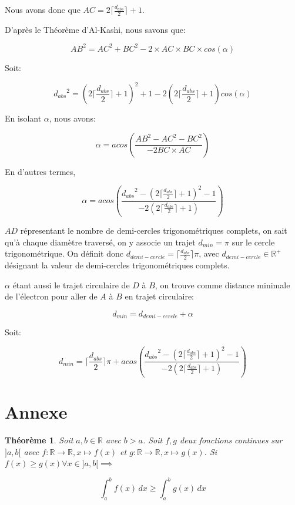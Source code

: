 \documentclass{amsart}
\newtheorem{theorem}{Théorème}[section]
\theoremstyle{definition}
\theoremstyle{remark}
\numberwithin{equation}{section}
\begin{document}
Nous avons donc que $AC=2\lceil\frac{d_{abs}}{2}\rceil+1$.

D'après le Théorème d'Al-Kashi, nous savons que:

\[AB^2=AC^2+BC^2-2\times AC \times BC \times cos(\alpha)\]

Soit: 

\[{d_{abs}}^2=(2\lceil\frac{d_{abs}}{2}\rceil+1)^2 +1 -2(2\lceil\frac{d_{abs}}{2}\rceil+1) cos(\alpha)\]

En isolant $\alpha$, nous avons:

\[\alpha=acos(\frac{AB^2-AC^2-BC^2}{-2BC\times AC})\]

En d'autres termes,

\[\alpha=acos(\frac{{d_{abs}}^2 -(2\lceil\frac{d_{abs}}{2}\rceil+1)^2-1}{-2(2\lceil\frac{d_{abs}}{2}\rceil+1)})\]

$AD$ répresentant le nombre de demi-cercles trigonométriques complets, on sait qu'à chaque diamètre traversé, on y associe un trajet $d_{min}=\pi$ sur le cercle trigonométrique. On définit donc $d_{demi-cercle}=\lceil \frac{d_{abs}}{2} \rceil\pi$, avec $d_{demi-cercle}\in\mathbb{R^+}$ désignant la valeur de demi-cercles trigonométriques complets.

$\alpha$ étant aussi le trajet circulaire de $D$ à $B$, on trouve comme distance minimale de l'électron pour aller de $A$ à $B$ en trajet circulaire:

\[d_{min}=d_{demi-cercle}+ \alpha\]

Soit:

\[d_{min}= \lceil\frac{d_{abs}}{2}\rceil\pi + acos(\frac{{d_{abs}}^2-(2\lceil\frac{d_{abs}}{2}\rceil+1)^2-1}{-2(2\lceil\frac{d_{abs}}{2}\rceil+1)})\]


\newpage

\section{Annexe}

\begin{theorem}
  Soit $a,b\in\mathbb{R}$ avec $b>a$. Soit $f,g$ deux fonctions continues sur $]a,b[$ avec $f:\mathbb{R}\longrightarrow \mathbb{R}, x\longmapsto f(x)$ et $g:\mathbb{R}\longrightarrow \mathbb{R}, x\longmapsto g(x)$. Si $f(x)\geq g(x) \forall x\in]a,b[\implies$

  \[\int_{a}^{b}f(x) \,dx \geq \int_{a}^{b}g(x) \,dx\]
\end{theorem}
\end{document}
